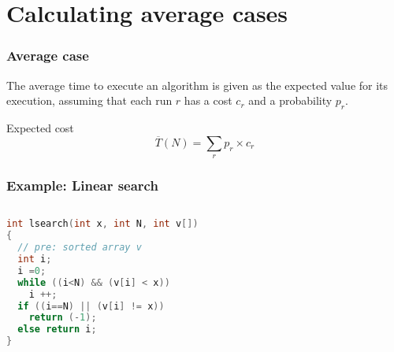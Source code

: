 \documentclass[aspectratio=169]{beamer}
\begin{document}
\section{Calculating average cases}


\begin{frame}\frametitle{Average case}
    
The average time to execute an algorithm is given as the \alert{expected value} for its execution, assuming that each run $r$ has a cost $c_r$ and a probability $p_r$.

\begin{block}{Expected cost}
  $$\overline{T}(N) = \sum_r p_r \times c_r$$
\end{block}
\end{frame}


\begin{frame}[fragile]\frametitle{Example: Linear search}
\begin{columns}
\begin{column}{0.48\textwidth}
\begin{lstlisting}[language=C++,emph={lsearch}]
int lsearch(int x, int N, int v[])
{
  // pre: sorted array v
  int i;
  i =0;
  while ((i<N) && (v[i] < x))
    i ++;
  if ((i==N) || (v[i] != x))
    return (-1);
  else return i;
}
\end{lstlisting}
\end{column}
\begin{column}{0.48\textwidth}
\end{column}
\end{columns}
\end{frame}
\end{document}
